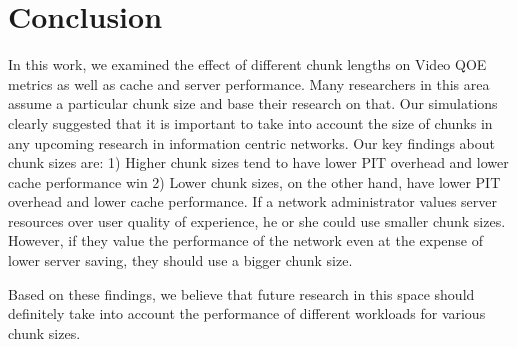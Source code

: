 \section{Conclusion} \label{sec:conclusion}

In this work, we examined the effect of different chunk lengths on
Video QOE metrics as well as cache and server performance. Many
researchers in this area assume a particular chunk size and base their
research on that. Our simulations clearly suggested that it is
important to take into account the size of chunks in any upcoming
research in information centric networks. Our key findings about chunk
sizes are: 1) Higher chunk sizes tend to have lower PIT overhead and
lower cache performance win 2) Lower chunk sizes, on the other hand,
have lower PIT overhead and lower cache performance.
If a network administrator values server resources over user quality of
experience, he or she could use smaller chunk sizes. However, if they value the
performance of the network even at the expense of lower server saving, they
should use a bigger chunk size.

Based on these
findings, we believe that future research in this space should definitely take
into account the performance of different workloads for various chunk sizes.
